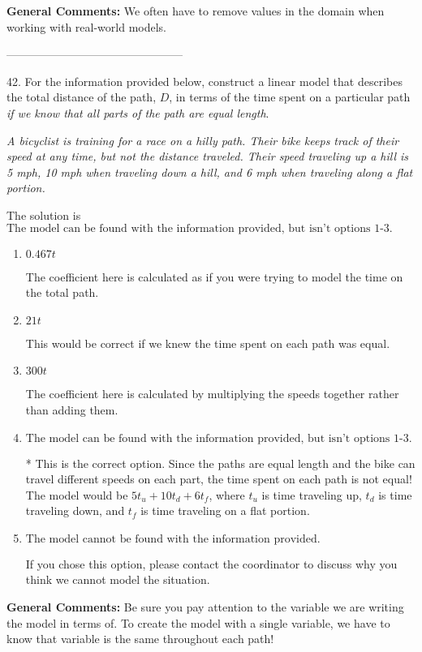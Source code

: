\documentclass{article}[14pt]
\begin{document}
\textbf{General Comments:} We often have to remove values in the domain when working with real-world models.

-----------------------------------------------

42. For the information provided below, construct a linear model that describes the total distance of the path, $D$, in terms of the time spent on a particular path \textit{if we know that all parts of the path are equal length}.
\begin{center} \textit{A bicyclist is training for a race on a hilly path. Their bike keeps track of their speed at any time, but not the distance traveled. Their speed traveling up a hill is 5 mph, 10 mph when traveling down a hill, and 6 mph when traveling along a flat portion.} \end{center} 
The solution is $ \text{The model can be found with the information provided, but isn't options 1-3.} $ 

\begin{enumerate}[label=\Alph*.] 
\item $ 0.467 t $ 

 The coefficient here is calculated as if you were trying to model the time on the total path. 
\item $ 21 t $ 

 This would be correct if we knew the time spent on each path was equal. 
\item $ 300 t $ 

 The coefficient here is calculated by multiplying the speeds together rather than adding them. 
\item $ \text{The model can be found with the information provided, but isn't options 1-3.} $ 

 * This is the correct option. Since the paths are equal length and the bike can travel different speeds on each part, the time spent on each path is not equal! The model would be $5t_u + 10t_d +6t_f$, where $t_u$ is time traveling up, $t_d$ is time traveling down, and $t_f$ is time traveling on a flat portion. 
\item $ \text{The model cannot be found with the information provided.} $ 

 If you chose this option, please contact the coordinator to discuss why you think we cannot model the situation. 
\end{enumerate} 
 
\textbf{General Comments:} Be sure you pay attention to the variable we are writing the model in terms of. To create the model with a single variable, we have to know that variable is the same throughout each path!
\end{document}
